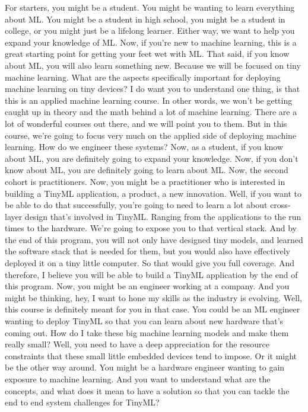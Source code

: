 For starters, you might be a student.
You might be wanting to learn everything about ML.
You might be a student in high school, you might be a student in college, or you might just be a lifelong learner.
Either way, we want to help you expand your knowledge of ML.
Now, if you're new to machine learning, this is a great starting point for getting your feet wet with ML.
That said, if you know about ML, you will also learn something new.
Because we will be focused on tiny machine learning.
What are the aspects specifically important for deploying machine learning on tiny devices?
I do want you to understand one thing, is that this is an applied machine learning course.
In other words, we won't be getting caught up in theory and the math behind a lot of machine learning.
There are a lot of wonderful courses out there, and we will point you to them.
But in this course, we're going to focus very much on the applied side of deploying machine learning.
How do we engineer these systems?
Now, as a student, if you know about ML, you are definitely going to expand your knowledge.
Now, if you don't know about ML, you are definitely going to learn about ML.
Now, the second cohort is practitioners.
Now, you might be a practitioner who is interested in building a TinyML application, a product, a new innovation.
Well, if you want to be able to do that successfully, you're going to need to learn a lot about cross-layer design that's involved in TinyML.
Ranging from the applications to the run times to the hardware.
We're going to expose you to that vertical stack.
And by the end of this program, you will not only have designed tiny models, and learned the software stack that is needed for them, but you would also have effectively deployed it on a tiny little computer.
So that would give you full coverage.
And therefore, I believe you will be able to build a TinyML application by the end of this program.
Now, you might be an engineer working at a company.
And you might be thinking, hey, I want to hone my skills as the industry is evolving.
Well, this course is definitely meant for you in that case.
You could be an ML engineer wanting to deploy TinyML so that you can learn about new hardware that's coming out.
How do I take these big machine learning models and make them really small?
Well, you need to have a deep appreciation for the resource constraints that these small little embedded devices tend to impose.
Or it might be the other way around.
You might be a hardware engineer wanting to gain exposure to machine learning.
And you want to understand what are the concepts, and what does it mean to have a solution so that you can tackle the end to end system challenges for TinyML?



